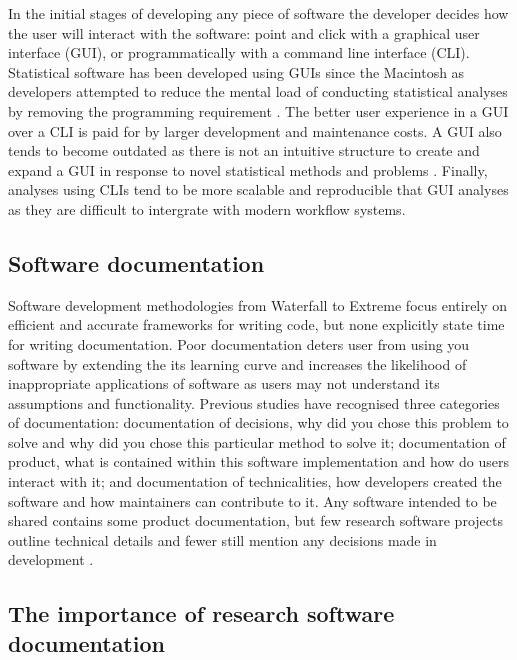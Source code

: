 \documentclass[../main.tex]{subfiles}
\begin{document}
In the initial stages of developing any piece of software the developer decides how the user will interact with the software: point and click with a graphical user interface (GUI), or programmatically with a command line interface (CLI).
Statistical software has been developed using GUIs since the Macintosh as developers attempted to reduce the mental load of conducting statistical analyses by removing the programming requirement \parencite{ValeroMora2012}. 
The better user experience in a GUI over a CLI \parencite{Staggers2000} is paid for by larger development and maintenance costs.
A GUI also tends to become outdated as there is not an intuitive structure to create and expand a GUI in response to novel statistical methods and problems \parencite{Unwin2012}.
Finally, analyses using CLIs tend to be more scalable and reproducible that GUI analyses as they are difficult to intergrate with modern workflow systems. 


\subsection{Software documentation}

Software development methodologies from Waterfall to Extreme focus entirely on efficient and accurate frameworks for writing code, but none explicitly state time for writing documentation. 
Poor documentation deters user from using you software by extending the its learning curve and increases the likelihood of inappropriate applications of software as users may not understand its assumptions and functionality.
Previous studies have recognised three categories of documentation: documentation of decisions, why did you chose this problem to solve and why did you chose this particular method to solve it; documentation of product, what is contained within this software implementation and how do users interact with it; and documentation of technicalities, how developers created the software and how maintainers can contribute to it. 
Any software intended to be shared contains some product documentation, but few research software projects outline technical details and fewer still mention any decisions made in development \parencite{Geiger2018}.

\subsection{The importance of research software documentation}
\end{document}
